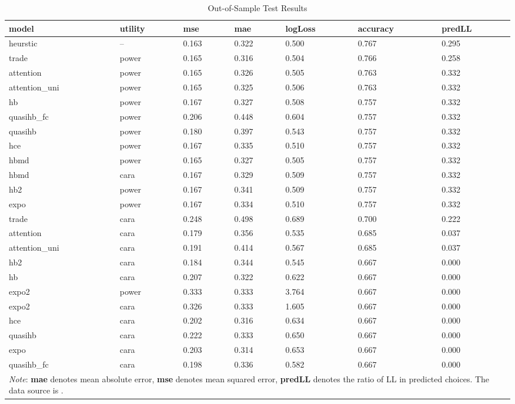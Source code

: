 \documentclass[
  12pt,
]{article}
\begin{document}
\begin{longtable}{@{}lllllll@{}}
\caption{Out-of-Sample Test Results}
\label{tab:chavez_test_result}\\
\toprule
\textbf{model} & \textbf{utility} & \textbf{mse} & \textbf{mae} & \textbf{logLoss} & \textbf{accuracy} & \textbf{predLL} \\* \midrule
\endhead
%
\bottomrule
\endfoot
%
\endlastfoot
%
heurstic       & --    & 0.163 & 0.322 & 0.500 & 0.767 & 0.295 \\
trade          & power & 0.165 & 0.316 & 0.504 & 0.766 & 0.258 \\
attention      & power & 0.165 & 0.326 & 0.505 & 0.763 & 0.332 \\
attention\_uni & power & 0.165 & 0.325 & 0.506 & 0.763 & 0.332 \\
hb             & power & 0.167 & 0.327 & 0.508 & 0.757 & 0.332 \\
quasihb\_fc    & power & 0.206 & 0.448 & 0.604 & 0.757 & 0.332 \\
quasihb        & power & 0.180 & 0.397 & 0.543 & 0.757 & 0.332 \\
hce            & power & 0.167 & 0.335 & 0.510 & 0.757 & 0.332 \\
hbmd           & power & 0.165 & 0.327 & 0.505 & 0.757 & 0.332 \\
hbmd           & cara  & 0.167 & 0.329 & 0.509 & 0.757 & 0.332 \\
hb2            & power & 0.167 & 0.341 & 0.509 & 0.757 & 0.332 \\
expo           & power & 0.167 & 0.334 & 0.510 & 0.757 & 0.332 \\
trade          & cara  & 0.248 & 0.498 & 0.689 & 0.700 & 0.222 \\
attention      & cara  & 0.179 & 0.356 & 0.535 & 0.685 & 0.037 \\
attention\_uni & cara  & 0.191 & 0.414 & 0.567 & 0.685 & 0.037 \\
hb2            & cara  & 0.184 & 0.344 & 0.545 & 0.667 & 0.000 \\
hb             & cara  & 0.207 & 0.322 & 0.622 & 0.667 & 0.000 \\
expo2          & power & 0.333 & 0.333 & 3.764 & 0.667 & 0.000 \\
expo2          & cara  & 0.326 & 0.333 & 1.605 & 0.667 & 0.000 \\
hce            & cara  & 0.202 & 0.316 & 0.634 & 0.667 & 0.000 \\
quasihb        & cara  & 0.222 & 0.333 & 0.650 & 0.667 & 0.000 \\
expo           & cara  & 0.203 & 0.314 & 0.653 & 0.667 & 0.000 \\
quasihb\_fc    & cara  & 0.198 & 0.336 & 0.582 & 0.667 & 0.000 \\* \bottomrule
\multicolumn{7}{p{0.8\textwidth}}{
\setstretch{1}
\textit{Note}: \textbf{mae} denotes mean absolute error, \textbf{mse} denotes mean squared error, \textbf{predLL} denotes the ratio of LL in predicted choices. The data source is \citet{chavez_hierarchical_2017}.
}
\end{longtable}
\end{document}
